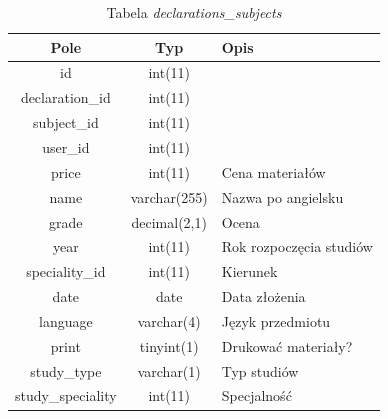 \documentclass[a4paper,12pt,oneside]{report}
\begin{document}
\begin{table}[h]
  \centering
  \begin{tabular}{|c|c|l|}\hline
  Pole & Typ & Opis \\\hline
  id   & int(11)   & \\
  declaration\_id   & int(11)      & \\
  subject\_id       & int(11)      & \\
  user\_id          & int(11)      & \\
  price             & int(11)      & Cena materiałów \\
  name              & varchar(255) & Nazwa po angielsku \\
  grade             & decimal(2,1) & Ocena \\
  year              & int(11)      & Rok rozpoczęcia studiów \\
  speciality\_id    & int(11)      & Kierunek \\
  date              & date         & Data złożenia \\
  language          & varchar(4)   & Język przedmiotu \\
  print             & tinyint(1)   & Drukować materiały? \\
  study\_type       & varchar(1)   & Typ studiów \\
  study\_speciality & int(11)      & Specjalność \\\hline
  \end{tabular}
  \caption{Tabela \emph{declarations\_subjects}\label{tab:declarations_subjects}}
\end{table}
\end{document}
